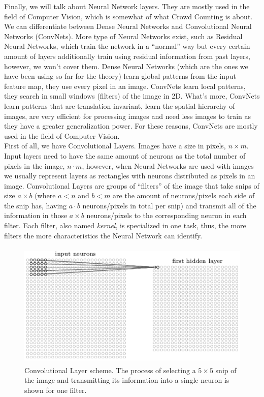 Finally, we will talk about Neural Network layers. They are mostly used in the field of Computer Vision, which is somewhat of what Crowd Counting is about. We can differentiate between Dense Neural Networks and Convolutional Neural Networks (ConvNets). More type of Neural Networks exist, such as Residual Neural Networks, which train the network in a ``normal'' way but every certain amount of layers additionally train using residual information from past layers, however, we won't cover them. Dense Neural Networks (which are the ones we have been using so far for the theory) learn global patterns from the input feature map, they use every pixel in an image. ConvNets learn local patterns, they search in small windows (filters) of the image in 2D. What's more, ConvNets learn patterns that are translation invariant, learn the spatial hierarchy of images, are very efficient for processing images and need less images to train as they have a greater generalization power. For these reasons, ConvNets are mostly used in the field of Computer Vision.\\

First of all, we have Convolutional Layers. Images have a size in pixels, $n \times m$. Input layers need to have the same amount of neurons as the total number of pixels in the image, $n \cdot m$, however, when Neural Networks are used with images we usually represent layers as rectangles with neurons distributed as pixels in an image. Convolutional Layers are groups of ``filters'' of the image that take snips of size $a \times b$ (where $a< n$ and $b<m$ are the amount of neurons/pixels each side of the snip has, having $a \cdot b$ neurons/pixels in total per snip) and transmit all of the information in those $a \times b$ neurons/pixels to the corresponding neuron in each filter. Each filter, also named \textit{kernel}, is specialized in one task, thus, the more filters the more characteristics the Neural Network can identify.\vspace{5cm}\\

\begin{figure}[h!]
  \begin{center}
    \includegraphics[width=120mm, height=60mm]{Figuras/ConvLayer.png}\par
    \caption{Convolutional Layer scheme. The process of selecting a $5\times 5$ snip of the image and transmitting its information into a single neuron is shown for one filter.}
    \label{fig:ConvLayer}
  \end{center}
\end{figure}

